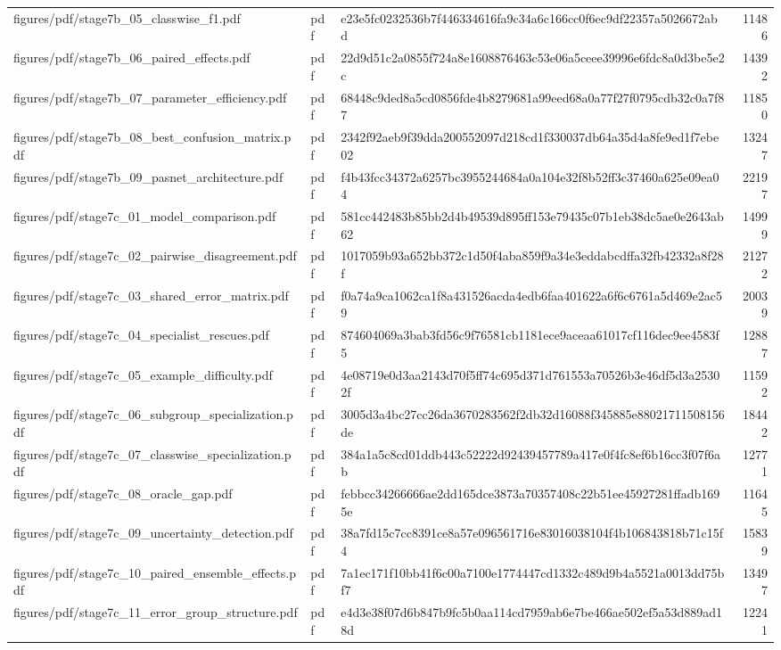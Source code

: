 \begin{tabular}{lllr}
figures/pdf/stage7b_05_classwise_f1.pdf & pdf & e23e5fc0232536b7f446334616fa9c34a6c166cc0f6ec9df22357a5026672abd & 11486 \\
figures/pdf/stage7b_06_paired_effects.pdf & pdf & 22d9d51c2a0855f724a8e1608876463c53e06a5ceee39996e6fdc8a0d3be5e2c & 14392 \\
figures/pdf/stage7b_07_parameter_efficiency.pdf & pdf & 68448c9ded8a5cd0856fde4b8279681a99eed68a0a77f27f0795cdb32c0a7f87 & 11850 \\
figures/pdf/stage7b_08_best_confusion_matrix.pdf & pdf & 2342f92aeb9f39dda200552097d218cd1f330037db64a35d4a8fe9ed1f7ebe02 & 13247 \\
figures/pdf/stage7b_09_pasnet_architecture.pdf & pdf & f4b43fcc34372a6257bc3955244684a0a104e32f8b52ff3c37460a625e09ea04 & 22197 \\
figures/pdf/stage7c_01_model_comparison.pdf & pdf & 581cc442483b85bb2d4b49539d895ff153e79435c07b1eb38dc5ae0e2643ab62 & 14999 \\
figures/pdf/stage7c_02_pairwise_disagreement.pdf & pdf & 1017059b93a652bb372c1d50f4aba859f9a34e3eddabcdffa32fb42332a8f28f & 21272 \\
figures/pdf/stage7c_03_shared_error_matrix.pdf & pdf & f0a74a9ca1062ca1f8a431526acda4edb6faa401622a6f6c6761a5d469e2ac59 & 20039 \\
figures/pdf/stage7c_04_specialist_rescues.pdf & pdf & 874604069a3bab3fd56c9f76581cb1181ece9aceaa61017cf116dec9ee4583f5 & 12887 \\
figures/pdf/stage7c_05_example_difficulty.pdf & pdf & 4e08719e0d3aa2143d70f5ff74c695d371d761553a70526b3e46df5d3a25302f & 11592 \\
figures/pdf/stage7c_06_subgroup_specialization.pdf & pdf & 3005d3a4bc27cc26da3670283562f2db32d16088f345885e88021711508156de & 18442 \\
figures/pdf/stage7c_07_classwise_specialization.pdf & pdf & 384a1a5c8cd01ddb443c52222d92439457789a417e0f4fc8ef6b16cc3f07f6ab & 12771 \\
figures/pdf/stage7c_08_oracle_gap.pdf & pdf & febbcc34266666ae2dd165dce3873a70357408c22b51ee45927281ffadb1695e & 11645 \\
figures/pdf/stage7c_09_uncertainty_detection.pdf & pdf & 38a7fd15c7cc8391ce8a57e096561716e83016038104f4b106843818b71c15f4 & 15839 \\
figures/pdf/stage7c_10_paired_ensemble_effects.pdf & pdf & 7a1ec171f10bb41f6c00a7100e1774447cd1332c489d9b4a5521a0013dd75bf7 & 13497 \\
figures/pdf/stage7c_11_error_group_structure.pdf & pdf & e4d3e38f07d6b847b9fc5b0aa114cd7959ab6e7be466ae502ef5a53d889ad18d & 12241 \\

\end{tabular}
